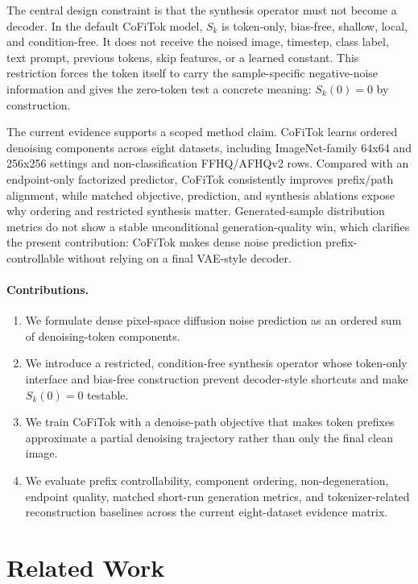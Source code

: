 \documentclass[letterpaper]{article}
\newcommand{\method}{CoFiTok}
\begin{document}
The central design constraint is that the synthesis operator must not become a
decoder. In the default \method{} model, $S_k$ is token-only, bias-free,
shallow, local, and condition-free. It does not receive the noised image,
timestep, class label, text prompt, previous tokens, skip features, or a learned
constant. This restriction forces the token itself to carry the sample-specific
negative-noise information and gives the zero-token test a concrete meaning:
$S_k(0)=0$ by construction.

The current evidence supports a scoped method claim. \method{} learns ordered
denoising components across eight datasets, including ImageNet-family 64x64 and
256x256 settings and non-classification FFHQ/AFHQv2 rows. Compared with an
endpoint-only factorized predictor, \method{} consistently improves
  prefix/path alignment, while matched objective, prediction, and synthesis
  ablations expose why ordering and restricted synthesis matter. Generated-sample
distribution metrics do not show a stable unconditional generation-quality win,
which clarifies the present contribution: \method{} makes dense noise
prediction prefix-controllable without relying on a final VAE-style decoder.

\paragraph{Contributions.}
\begin{enumerate}
  \item We formulate dense pixel-space diffusion noise prediction as an ordered
  sum of denoising-token components.
  \item We introduce a restricted, condition-free synthesis operator whose
  token-only interface and bias-free construction prevent decoder-style
  shortcuts and make $S_k(0)=0$ testable.
  \item We train \method{} with a denoise-path objective that makes token
  prefixes approximate a partial denoising trajectory rather than only the final
  clean image.
  \item We evaluate prefix controllability, component ordering,
  non-degeneration, endpoint quality, matched short-run generation metrics, and
  tokenizer-related reconstruction baselines across the current eight-dataset
  evidence matrix.
\end{enumerate}

\section{Related Work}
\end{document}

